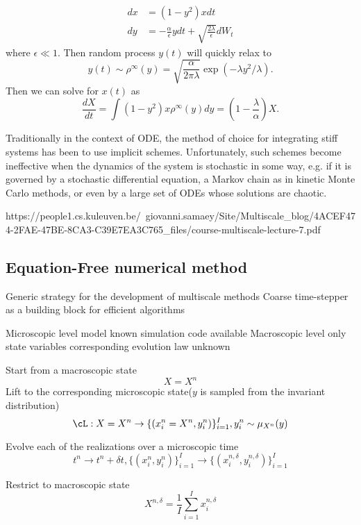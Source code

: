 \begin{refsection}
\begin{example}\cite[149]{pavliotis2008multiscale}
	\begin{align*}
	dx &= (1-y^2)xdt\\
	dy &= -\frac{\alpha}{\epsilon}ydt + \sqrt{\frac{2\lambda}{\epsilon}} dW_t
	\end{align*}
	where $\epsilon \ll 1$. Then random process $y(t)$ will  quickly relax to $$y(t) \sim \rho^{\infty} (y) = \sqrt{\frac{\alpha}{2\pi\lambda}} \exp(-\lambda y^2 /\lambda).$$
	Then we can solve for $x(t)$ as
	$$\frac{dX}{dt} = \int (1-y^2) x \rho^\infty (y)dy = (1 - \frac{\lambda}{\alpha})X.$$
\end{example}

\begin{remark}
	Traditionally in the context of ODE, the method of choice for integrating stiff systems has been to use implicit schemes. Unfortunately, such schemes become ineffective when the dynamics of the system is stochastic in some way, e.g. if it is governed by a stochastic differential equation, a Markov chain as in kinetic Monte Carlo methods, or even by a large set of ODEs whose solutions are chaotic.
\end{remark}


\iffalse
https://people1.cs.kuleuven.be/~giovanni.samaey/Site/Multiscale_blog/4ACEF474-2FAE-47BE-8CA3-C39E7EA3C765_files/course-multiscale-lecture-7.pdf
\subsection{Equation-Free numerical method}
Generic strategy for the development of multiscale methods
Coarse time-stepper as a building block for efficient algorithms

Microscopic level
model known
simulation code available
Macroscopic level
only state variables
corresponding evolution law
unknown

Start from a macroscopic state 
$$X = X^n$$
Lift to the corresponding microscopic state($y$ is sampled from the invariant distribution)
$$\cL: X = X^n \to \{(x_i^n = X^n, y_i^n)\}_{i=1}^I,y_i^n \sim \mu_{X^n}(y)$$

Evolve each of the realizations over a microscopic time 
$$t^n\to t^n + \delta t, \{(x_i^n , y_i^n)\}_{i=1}^I \to \{(x_i^{n,\delta} , y_i^{n,\delta})\}_{i=1}^I$$

Restrict to macroscopic state
$$X^{n,\delta} = \frac{1}{I} \sum_{i=1}^I x_i^{n,\delta}$$


\end{refsection}
